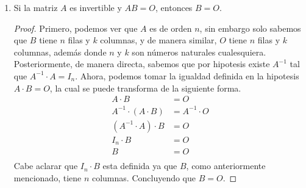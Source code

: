 \begin{enumerate}[label=\listAlph]
\begin{proof}
                se obtiene que la matriz \(AA^T = \left(AA^T\right){}^T\), es decir, \(AA^T\) es una matriz simétrica para cualquier matriz \(A\).
            \end{proof}
        \item Si la matriz \(A\) es invertible y \(AB = O\), entonces \(B = O\).
            \begin{proof}
                Primero, podemos ver que \(A\) es de orden \(n\), sin embargo solo sabemos que \(B\) tiene \(n\) filas y \(k\) columnas, y de manera similar, 
                \(O\) tiene \(n\) filas y \(k\) columnas, además donde \(n\) y \(k\) son números naturales cualesquiera.
                Posteriormente, de manera directa, sabemos que por hipotesis existe \(A^{-1}\) tal que \(A^{-1} \cdot A = I_n\). 
                Ahora, podemos tomar la igualdad definida en la hipotesis \(A \cdot B = O\), la cual se puede transforma de la siguiente forma.
                \[
                    \begin{aligned}
                        A \cdot B &= O \\
                        A^{-1} \cdot (A \cdot B) &= A^{-1} \cdot O \\
                        \left(A^{-1} \cdot A\right) \cdot B &= O \\
                        I_n \cdot B &= O \\
                        B &= O \\
                    \end{aligned}
                \]
                Cabe aclarar que \(I_n \cdot B\) esta definida ya que \(B\), como anteriormente mencionado, tiene \(n\) columnas. Concluyendo que \(B = O\).
            \end{proof}
    \end{enumerate}
